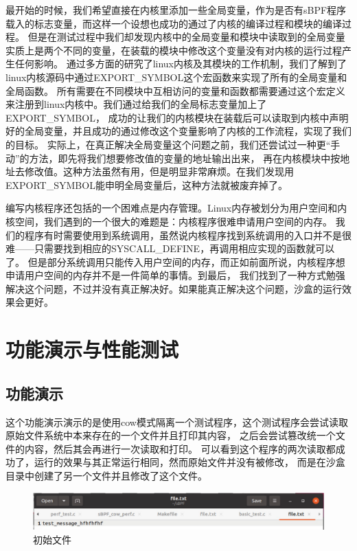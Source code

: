 \documentclass[AutoFakeBold,a4paper]{ctexart}
\begin{document}
最开始的时候，我们希望直接在内核里添加一些全局变量，作为是否有sBPF程序载入的标志变量，而这样一个设想也成功的通过了内核的编译过程和模块的编译过程。
但是在测试过程中我们却发现内核中的全局变量和模块中读取到的全局变量实质上是两个不同的变量，在装载的模块中修改这个变量没有对内核的运行过程产生任何影响。
通过多方面的研究了linux内核及其模块的工作机制，我们了解到了linux内核源码中通过{\ttfamily EXPORT\_SYMBOL}这个宏函数来实现了所有的全局变量和全局函数。
所有需要在不同模块中互相访问的变量和函数都需要通过这个宏定义来注册到linux内核中。我们通过给我们的全局标志变量加上了{\ttfamily EXPORT\_SYMBOL}，
成功的让我们的内核模块在装载后可以读取到内核中声明好的全局变量，并且成功的通过修改这个变量影响了内核的工作流程，实现了我们的目标。
实际上，在真正解决全局变量这个问题之前，我们还尝试过一种更“手动”的方法，即先将我们想要修改值的变量的地址输出出来，
再在内核模块中按地址去修改值。这种方法虽然有用，但是明显非常麻烦。在我们发现用{\ttfamily EXPORT\_SYMBOL}能申明全局变量后，这种方法就被废弃掉了。

编写内核程序还包括的一个困难点是内存管理。Linux内存被划分为用户空间和内核空间，我们遇到的一个很大的难题是：内核程序很难申请用户空间的内存。
我们的程序有时需要使用到系统调用，虽然说内核程序找到系统调用的入口并不是很难——只需要找到相应的SYSCALL\_DEFINE，再调用相应实现的函数就可以了。
但是部分系统调用只能传入用户空间的内存，而正如前面所说，内核程序想申请用户空间的内存并不是一件简单的事情。到最后，
我们找到了一种方式勉强解决这个问题，不过并没有真正解决好。如果能真正解决这个问题，沙盒的运行效果会更好。

\section{功能演示与性能测试}
\subsection{功能演示}
这个功能演示演示的是使用cow模式隔离一个测试程序，这个测试程序会尝试读取原始文件系统中本来存在的一个文件并且打印其内容，
之后会尝试篡改统一个文件的内容，然后其会再进行一次读取和打印。 可以看到这个程序的两次读取都成功了，运行的效果与其正常运行相同，然而原始文件并没有被修改，
而是在沙盒目录中创建了另一个文件并且修改了这个文件。

\begin{figure}[H]
    \centering
    \includegraphics[width=\columnwidth]{pic8.png}
    \caption{初始文件}
\end{figure}
\end{document}
